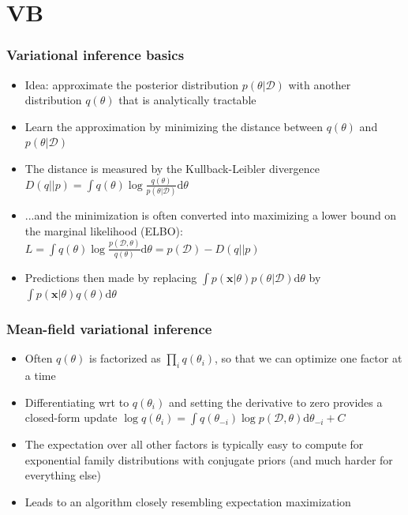 \documentclass{beamer}
\newcommand{\dataset}{\mathcal{D}}
\newcommand{\parameters}{\theta}
\newcommand{\vx}{\mathbf{x}}
\newcommand{\diff}{\mathrm{d}}
\begin{document}
\section{VB}

\begin{frame}
  \frametitle{Variational inference basics}

  \begin{itemize}
  \item Idea: approximate the posterior distribution $p(\parameters | \dataset)$
    with another distribution $q(\parameters)$ that is analytically tractable
  \item Learn the approximation by minimizing the distance between $q(\parameters)$ and $p(\parameters | \dataset)$
  \item The distance is measured by the Kullback-Leibler divergence
    $D(q||p) = \int q(\parameters) \log \frac{q(\parameters)}{p(\parameters| \dataset)}\diff \parameters$
  \item ...and the minimization is often converted into maximizing a lower bound on the marginal
    likelihood (ELBO):
    $L = \int q(\parameters) \log \frac{p(\dataset,\parameters)}{q(\parameters)} \diff \parameters= p(\dataset) - D(q||p)$
  \item Predictions then made by replacing $\int p(\vx|\parameters) p(\parameters | \dataset) \diff \parameters$ by
    $\int p(\vx|\parameters) q(\parameters) \diff \parameters$
  \end{itemize}
\end{frame}

\begin{frame}
  \frametitle{Mean-field variational inference}

  \begin{itemize}
    \item Often $q(\parameters)$ is factorized as $\prod_i q(\parameters_i)$, so that
      we can optimize one factor at a time
    \item Differentiating wrt to $q(\parameters_i)$ and setting the derivative to zero provides a closed-form
      update $\log q(\parameters_i) = \int q(\parameters_{-i}) \log p(\dataset, \parameters) \diff \parameters_{-i} + C$
    \item The expectation over all other factors is typically easy to compute for exponential
      family distributions with conjugate priors (and much harder for everything else)
    \item Leads to an algorithm closely resembling expectation maximization
  \end{itemize}
\end{frame}
\end{document}
